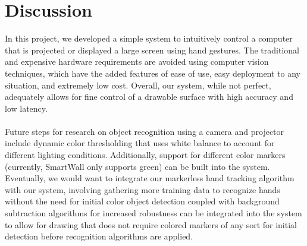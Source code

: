 \documentclass[twoside,twocolumn]{article}
\begin{document}



\section{Discussion}
In this project, we developed a simple system to intuitively control a computer that is projected or displayed a large screen using hand gestures. The traditional and expensive hardware requirements are avoided using computer vision techniques, which have the added features of ease of use, easy deployment to any situation, and extremely low cost. Overall, our system, while not perfect, adequately allows for fine control of a drawable surface with high accuracy and low latency.\\ \\ Future steps for research on object recognition using a camera and projector include dynamic color thresholding that uses white balance to account for different lighting conditions. Additionally, support for different color markers (currently, SmartWall only supports green) can be built into the system. Eventually, we would want to integrate our markerless hand tracking algorithm with our system, involving gathering more training data to recognize hands without the need for initial color object detection coupled with background subtraction algorithms for increased robustness can be integrated into the system to allow for drawing that does not require colored markers of any sort for initial detection before recognition algorithms are applied.\\

\end{document}
